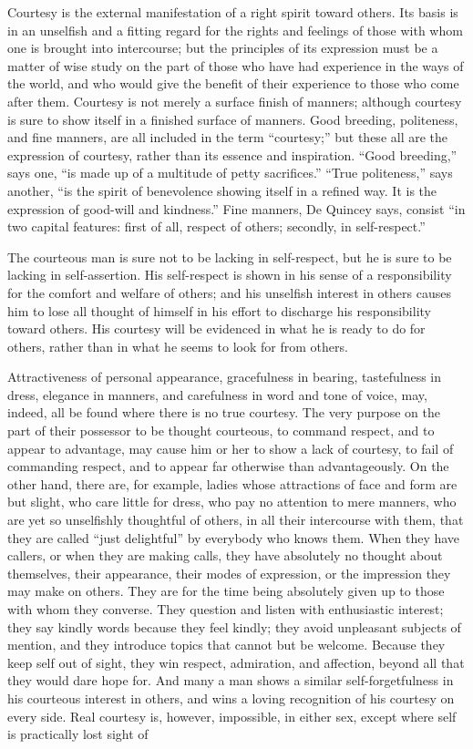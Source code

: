 \documentclass[
]{book}
\begin{document}
Courtesy is the external manifestation of a right spirit toward others. Its basis is in an unselfish and a fitting regard for the rights and feelings of those with whom one is brought into intercourse; but the principles of its expression must be a matter of wise study on the part of those who have had experience in the ways of the world, and who would give the benefit of their experience to those who come after them. Courtesy is not merely a surface finish of manners; although courtesy is sure to show itself in a finished surface of manners. Good breeding, politeness, and fine manners, are all included in the term ``courtesy;'' but these all are the expression of courtesy, rather than its essence and inspiration. ``Good breeding,'' says one, ``is made up of a multitude of petty sacrifices.'' ``True politeness,'' says another, ``is the spirit of benevolence showing itself in a refined way. It is the expression of good-will and kindness.'' Fine manners, De Quincey says, consist ``in two capital features: first of all, respect of others; secondly, in self-respect.''

The courteous man is sure not to be lacking in self-respect, but he is sure to be lacking in self-assertion. His self-respect is shown in his sense of a responsibility for the comfort and welfare of others; and his unselfish interest in others causes him to lose all thought of himself in his effort to discharge his responsibility toward others. His courtesy will be evidenced in what he is ready to do for others, rather than in what he seems to look for from others.

Attractiveness of personal appearance, gracefulness in bearing, tastefulness in dress, elegance in manners, and carefulness in word and tone of voice, may, indeed, all be found where there is no true courtesy. The very purpose on the part of their possessor to be thought courteous, to command respect, and to appear to advantage, may cause him or her to show a lack of courtesy, to fail of commanding respect, and to appear far otherwise than advantageously. On the other hand, there are, for example, ladies whose attractions of face and form are but slight, who care little for dress, who pay no attention to mere manners, who are yet so unselfishly thoughtful of others, in all their intercourse with them, that they are called ``just delightful'' by everybody who knows them. When they have callers, or when they are making calls, they have absolutely no thought about themselves, their appearance, their modes of expression, or the impression they may make on others. They are for the time being absolutely given up to those with whom they converse. They question and listen with enthusiastic interest; they say kindly words because they feel kindly; they avoid unpleasant subjects of mention, and they introduce topics that cannot but be welcome. Because they keep self out of sight, they win respect, admiration, and affection, beyond all that they would dare hope for. And many a man shows a similar self-forgetfulness in his courteous interest in others, and wins a loving recognition of his courtesy on every side. Real courtesy is, however, impossible, in either sex, except where self is practically lost sight of
\end{document}
